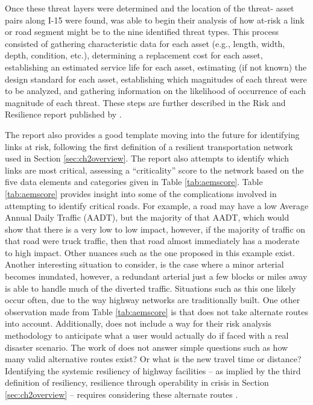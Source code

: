 Once these threat layers were determined and the location of the threat-
asset pairs along I-15
were found, \citet{aem2017} was able to begin their analysis of how at-risk a link or road
segment might be to the nine identified threat types. This process consisted of
gathering characteristic
data for each asset (e.g., length, width, depth, condition, etc.), determining a
replacement cost for
each asset, establishing an estimated service life for each asset,
estimating (if not known) the
design standard for each asset, establishing which magnitudes of each
threat were to be analyzed,
and gathering information on the likelihood of occurrence of each
magnitude of each threat. These
steps are further described in the Risk and Resilience report published by \citet{aem2017}.

The report also provides a good template moving into the future for identifying
links at risk,
following the first definition of a resilient transportation network used in Section \ref{sec:ch2overview}. The
report also attempts to
identify which links are most critical, assessing a “criticality”
score to the network
based on the five data elements and categories given in Table \ref{tab:aemscore}.
Table \ref{tab:aemscore} provides insight into some of the complications involved in
attempting to identify critical roads. For example, a road may have a low Average Annual Daily Traffic (AADT), but
the majority of that AADT, which would show that there is a very low to low impact,
however, if the majority of traffic on that road were truck traffic, then that road almost
immediately has a moderate to high impact. Other nuances such as the one proposed in this
example exist. Another interesting situation to consider, is the case where a minor arterial becomes inundated, however, a redundant arterial just a few blocks or miles away is able to handle much of the diverted traffic. Situations such as this one likely occur often, due to the way highway networks are traditionally built. One other observation made from Table
\ref{tab:aemscore} is that \citet{aem2017} does not take alternate routes into account.
Additionally, \citet{aem2017} does not include a way for their risk analysis methodology
to anticipate what a user would actually do if faced with a real disaster
scenario. The work of \citet{aem2017} does not answer simple questions such as how many valid
alternative routes exist? Or what is the new travel time or distance?
Identifying the systemic resiliency of highway facilities
– as implied by the third definition of resiliency, resilience through
operability in crisis in Section \ref{sec:ch2overview} – requires considering these alternate routes \citep{aem2017}.

